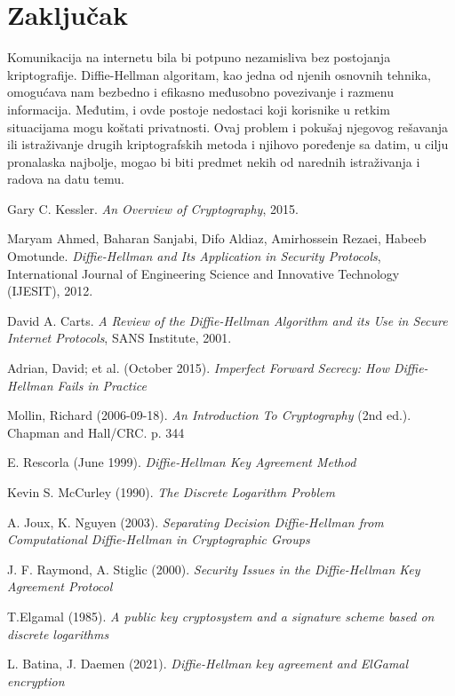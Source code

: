 \documentclass[a4paper]{article}
\begin{document}
\section{Zaključak}
\label{sec:zakljucak}

Komunikacija na internetu bila bi potpuno nezamisliva bez postojanja kriptografije. Diffie-Hellman algoritam, kao jedna od njenih osnovnih tehnika, omogućava nam bezbedno i efikasno međusobno povezivanje i razmenu informacija. Međutim, i ovde postoje nedostaci koji korisnike u retkim situacijama mogu koštati privatnosti. Ovaj problem i pokušaj njegovog rešavanja ili istraživanje drugih kriptografskih metoda i njihovo poređenje sa datim, u cilju pronalaska najbolje, mogao bi biti predmet nekih od narednih istraživanja i radova na datu temu.

\appendix

\begin{thebibliography}{9}

 Gary C. Kessler. \emph{An Overview of Cryptography}, 2015.

 Maryam Ahmed, Baharan Sanjabi, Difo Aldiaz, Amirhossein Rezaei, Habeeb Omotunde. \emph{Diffie-Hellman and Its Application in Security Protocols}, International Journal of Engineering Science and Innovative Technology (IJESIT), 2012.

 David A. Carts. \emph{A Review of the Diffie-Hellman Algorithm and its Use in Secure Internet Protocols}, SANS Institute, 2001.

 Adrian, David; et al. (October 2015). \emph{Imperfect Forward Secrecy: How Diffie-Hellman Fails in Practice}

 Mollin, Richard (2006-09-18). \emph{An Introduction To Cryptography} (2nd ed.). Chapman and Hall/CRC. p. 344

 E. Rescorla (June 1999). \emph{Diffie-Hellman Key Agreement Method}

 Kevin S. McCurley (1990). \emph{The Discrete Logarithm Problem}

 A. Joux, K. Nguyen (2003). \emph{Separating Decision Diffie-Hellman from Computational Diffie-Hellman in Cryptographic Groups}

 J. F. Raymond, A. Stiglic (2000). \emph{Security Issues in the Diffie-Hellman Key Agreement Protocol}

 T.Elgamal (1985). \emph{A public key cryptosystem and a signature scheme based on discrete logarithms}

 L. Batina, J. Daemen (2021). \emph{Diffie-Hellman key agreement and ElGamal encryption}

\end{thebibliography}


\end{document}
